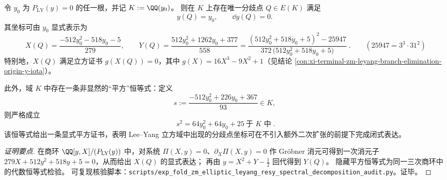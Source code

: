 \begin{conclusion}\label{con:xi-terminal-zm-leyang-branchpoint-explicit-coordinates-hidden-square}
令 \(y_0\) 为 \(P_{\mathrm{LY}}(y)=0\) 的任一根，并记 \(K:=\QQ(y_0)\)。
则在 \(K\) 上存在唯一分歧点 \(Q\in E(K)\) 满足
\[
y(Q)=y_0,\qquad \dd y(Q)=0.
\]
其坐标可由 \(y_0\) 显式表示为
\[
\boxed{\;
X(Q)=\frac{-512y_0^{2}-518y_0-5}{279},\qquad
Y(Q)=\frac{512y_0^{2}+1262y_0+377}{558}
=\frac{(512y_0^{2}+518y_0+5)^{2}-25947}{372\,\bigl(512y_0^{2}+518y_0+5\bigr)}\; }.
\qquad (25947=3^{3}\cdot 31^{2})
\]
特别地，\(X(Q)\) 满足立方证书 \(g(X(Q))=0\)，其中 \(g(X)=16X^{3}-9X^{2}+1\)（见结论 \ref{con:xi-terminal-zm-leyang-branch-elimination-origin-y-iota}）。
\par
此外，域 \(K\) 中存在一条非显然的“平方”恒等式：定义
\[
s:=\frac{-512y_0^{2}+226y_0+367}{93}\in K,
\]
则严格成立
\[
\boxed{\;s^{2}=64y_0^{2}+64y_0+25\ \text{于 }K\text{ 中}\; }.
\]
该恒等式给出一条显式平方证书，表明 Lee--Yang 立方域中出现的分歧点坐标可在不引入额外二次扩张的前提下完成闭式表达。
\end{conclusion}
\begin{proof}[证明要点]
在商环 \(\QQ[y,X]/(P_{\mathrm{LY}}(y))\) 中，对系统 \(\Pi(X,y)=0\)、\(\partial_{X}\Pi(X,y)=0\) 作 Gröbner 消元可得到一次消元子
\(
279X+512y^{2}+518y+5=0
\)，从而给出 \(X(Q)\) 的显式表达；
再由 \(y=X^{2}+Y-\tfrac12\) 回代得到 \(Y(Q)\)。
隐藏平方恒等式为同一三次商环中的代数恒等式检验。
可复现核验脚本：\texttt{scripts/exp\_fold\_zm\_elliptic\_leyang\_resy\_spectral\_decomposition\_audit.py}。证毕。
\end{proof}

